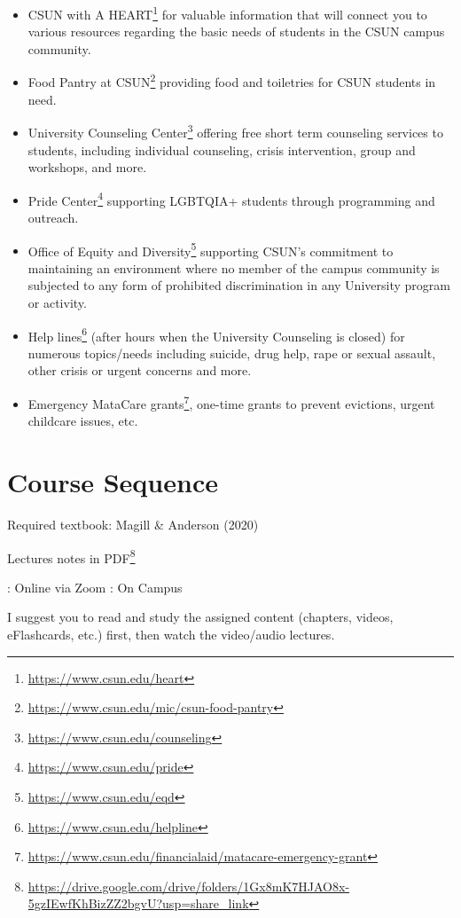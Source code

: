 \documentclass[
  letterpaper,
  DIV=11,
  numbers=noendperiod]{scrartcl}
\DeclareRobustCommand{\href}[2]{#2\footnote{\url{#1}}}
\begin{document}
\begin{itemize}
\item
  \href{https://www.csun.edu/heart}{CSUN with A HEART} for valuable
  information that will connect you to various resources regarding the
  basic needs of students in the CSUN campus community.
\item
  \href{https://www.csun.edu/mic/csun-food-pantry}{Food Pantry at CSUN}
  providing food and toiletries for CSUN students in need.
\item
  \href{https://www.csun.edu/counseling}{University Counseling Center}
  offering free short term counseling services to students, including
  individual counseling, crisis intervention, group and workshops, and
  more.
\item
  \href{https://www.csun.edu/pride}{Pride Center} supporting LGBTQIA+
  students through programming and outreach.
\item
  \href{https://www.csun.edu/eqd}{Office of Equity and Diversity}
  supporting CSUN's commitment to maintaining an environment where no
  member of the campus community is subjected to any form of prohibited
  discrimination in any University program or activity.
\item
  \href{https://www.csun.edu/helpline}{Help lines} (after hours when the
  University Counseling is closed) for numerous topics/needs including
  suicide, drug help, rape or sexual assault, other crisis or urgent
  concerns and more.
\item
  \href{https://www.csun.edu/financialaid/matacare-emergency-grant}{Emergency
  MataCare grants}, one-time grants to prevent evictions, urgent
  childcare issues, etc.
\end{itemize}

\hypertarget{course-sequence}{%
\section{Course Sequence}\label{course-sequence}}

Required textbook: Magill \& Anderson (2020)

\href{https://drive.google.com/drive/folders/1Gx8mK7HJAO8x-5gzIEwfKhBizZZ2bgvU?usp=share_link}{Lectures
notes in PDF}

: Online via Zoom : On Campus

\begin{tcolorbox}[enhanced jigsaw, leftrule=.75mm, breakable, opacityback=0, bottomrule=.15mm, rightrule=.15mm, colbacktitle=quarto-callout-important-color!10!white, colframe=quarto-callout-important-color-frame, arc=.35mm, bottomtitle=1mm, left=2mm, title=\textcolor{quarto-callout-important-color}{\faExclamation}\hspace{0.5em}{Important}, titlerule=0mm, toptitle=1mm, toprule=.15mm, opacitybacktitle=0.6, colback=white, coltitle=black]

I suggest you to read and study the assigned content (chapters, videos,
eFlashcards, etc.) first, then watch the video/audio lectures.

\end{tcolorbox}
\end{document}
